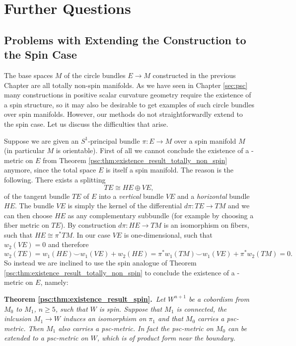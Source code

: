 \section{Further Questions}

\subsection{Problems with Extending the Construction to the Spin Case}

The base spaces $M$ of the circle bundles $E \to M$ constructed in the previous Chapter are all totally non-spin manifolds. As we have seen in Chapter \ref{sec:psc} many constructions in positive scalar curvature geometry require the existence of a spin structure, so it may also be desirable to get examples of such circle bundles over spin manifolds. However, our methods do not straightforwardly extend to the spin case. Let us discuss the difficulties that arise. 

Suppose we are given an $S^1$-principal bundle $\pi \colon E \to M$ over a spin manifold $M$ (in particular $M$ is orientable). First of all we cannot conclude the existence of a \psc-metric on $E$ from Theorem \ref{psc:thm:existence_result_totally_non_spin} anymore, since the total space $E$ is itself a spin manifold. The reason is the following. There exists a splitting 
\[
TE \cong HE \oplus VE,
\]
of the tangent bundle $TE$ of $E$ into a \textit{vertical} bundle $VE$ and a \textit{horizontal} bundle $HE$. The bundle $VE$ is simply the kernel of the differential $d\pi \colon TE \to TM$ and we can then choose $HE$ as any complementary subbundle (for example by choosing a fiber metric on $TE$). By construction $d \pi \colon HE \to TM$ is an isomorphism on fibers, such that $HE \cong \pi^\ast TM$. In our case $VE$ is one-dimensional, such that $w_2(VE) = 0$ and therefore
\[
w_2(TE) = w_1(HE) \smile w_1(VE) + w_2(HE) = \pi^\ast w_1(TM) \smile w_1(VE) + \pi^\ast w_2(TM) = 0.
\]
So instead we are inclined to use the spin analogue of Theorem \ref{psc:thm:existence_result_totally_non_spin} to conclude the existence of a \psc-metric on $E$, namely:

\vspace{\baselineskip}
\noindent\textbf{Theorem \ref{psc:thm:existence_result_spin}.}\itshape\ 
Let $W^{n+1}$ be a cobordism from $M_0$ to $M_1$, $n \geq 5$, such that $W$ is spin. Suppose that $M_1$ is connected, the inlcusion $M_1 \to W$ induces an isomorphism on $\pi_1$ and that $M_0$ carries a psc-metric. Then $M_1$ also carries a psc-metric. In fact the psc-metric on $M_0$ can be extended to a psc-metric on $W$, which is of product form near the boundary. 
\normalfont
\vspace{\baselineskip}


